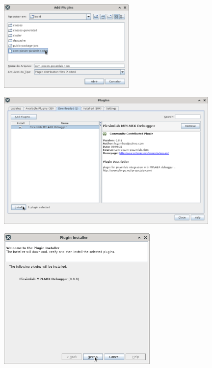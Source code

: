 \begin{figure}[H]
\center
\includegraphics[width=0.6\textwidth]{img/hmd/mplab04.png} 
\end{figure} 

\begin{figure}[H]
\center
\includegraphics[width=0.98\textwidth]{img/hmd/mplab05.png} 
\end{figure} 


\begin{figure}[H]
\center
\includegraphics[width=0.7\textwidth]{img/hmd/mplab06.png} 
\end{figure} 


